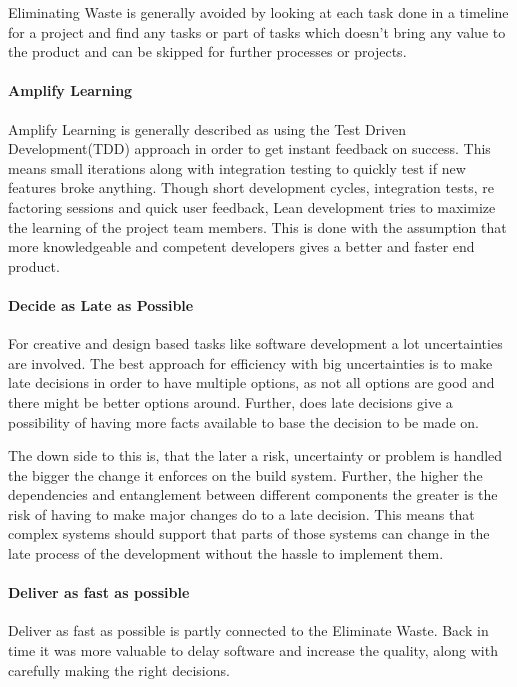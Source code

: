 \documentclass{sig-alternate}
\begin{document}
Eliminating Waste is generally avoided by looking at each task done in a timeline for a project
and find any tasks or part of tasks which doesn't bring any value to the product and can be 
skipped for further processes or projects.
 
\paragraph{Amplify Learning}
Amplify Learning is generally described as using the Test Driven Development(TDD) approach in order to 
get instant feedback on success.
This means small iterations along with integration testing to quickly test if new features broke anything.
Though short development cycles, integration tests, re factoring sessions and quick user feedback, Lean development tries to maximize the learning of the project team members. This is done with the assumption that more knowledgeable and competent developers gives a better and faster end product.

\paragraph{Decide as Late as Possible}
For creative and design based tasks like software development a lot uncertainties are involved. 
The best approach for efficiency with big uncertainties is to make late decisions in order to have multiple
options, as not all options are good and there might be better options around. Further, does late decisions give a possibility of having more facts available to base the decision to be made on. 

The down side to this is, that the later a risk, uncertainty or problem is handled the bigger the change it enforces on the build system. Further, the higher the dependencies and entanglement between different components the greater is the risk of having to make major changes do to a late decision. This means that complex systems should support that parts of those systems can change in the late process
 of the development without the hassle to implement them.

\paragraph{Deliver as fast as possible}
Deliver as fast as possible is partly connected to the Eliminate Waste. 
Back in time it was more valuable to delay software and increase the quality, along with carefully making 
the right decisions.
\end{document}
